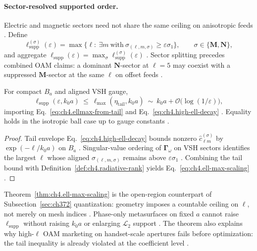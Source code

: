 \paragraph{Sector-resolved supported order.}
Electric and magnetic sectors need not share the same ceiling on anisotropic feeds \cite{harrington2001}. Define
\begin{equation}
\label{eq:ch4.ell-sector-supported}
\ell_{\mathrm{supp}}^{(\sigma)}(\varepsilon)
=
\max\big\{\ell:\ \exists m\ \text{with}\ \sigma_{(\ell,m,\sigma)}\ge\varepsilon\sigma_{1}\big\},
\qquad
\sigma\in\{\mathbf{M},\mathbf{N}\},
\end{equation}
and aggregate \(\ell_{\mathrm{supp}}(\varepsilon)=\max_{\sigma}\ell_{\mathrm{supp}}^{(\sigma)}(\varepsilon)\) \cite{hansen1988,stratton1941}.
Sector splitting precedes combined OAM claims: a dominant \(\mathbf{N}\)-sector at \(\ell=5\) may coexist with a suppressed
\(\mathbf{M}\)-sector at the same \(\ell\) on offset feeds \cite{harrington2001,devaney2004}.

\begin{theorem}
\label{thm:ch4.ell-max-scaling}
For compact \(B_{a}\) and aligned VSH gauge,
\begin{equation}
\label{eq:ch4.ell-max-scaling}
\ell_{\mathrm{supp}}(\varepsilon,k_{0}a)
\ \le\
\ell_{\max}(\eta_{\mathrm{tail}},k_{0}a)
\ \sim\
k_{0}a+\mathcal{O}\!\big(\log(1/\varepsilon)\big),
\end{equation}
importing Eq.~\eqref{eq:ch4.ellmax-from-tail} and Eq.~\eqref{eq:ch4.high-ell-decay} \cite{hansen1988,jackson1999,stratton1941}.
Equality holds in the isotropic ball case up to gauge constants \cite{harrington2001,devaney2004}.
\end{theorem}
\begin{proof}
Tail envelope Eq.~\eqref{eq:ch4.high-ell-decay} bounds nonzero \(\widehat{c}_{\ell m}^{(\sigma)}\) by
\(\exp(-\ell/k_{0}a)\) on \(B_{a}\) \cite{hansen1988,jackson1999}. Singular-value ordering of \(\boldsymbol{\Gamma}_\omega\) on VSH
sectors identifies the largest \(\ell\) whose aligned \(\sigma_{(\ell,m,\sigma)}\) remains above \(\varepsilon\sigma_{1}\)
\cite{stratton1941,harrington2001}. Combining the tail bound with Definition~\ref{def:ch4.radiative-rank} yields
Eq.~\eqref{eq:ch4.ell-max-scaling} \cite{devaney2004}.
\end{proof}

Theorem~\ref{thm:ch4.ell-max-scaling} is the open-region counterpart of Subsection~\ref{sec:ch372} quantization: geometry imposes a
countable ceiling on \(\ell\), not merely on mesh indices \cite{stratton1941}. Phase-only metasurfaces on fixed \(a\) cannot raise
\(\ell_{\mathrm{supp}}\) without raising \(k_{0}a\) or enlarging \(\mathcal{L}_{2}\) support \cite{devaney2004,hansen1988}. The theorem
also explains why high-\(\ell\) OAM marketing on handset-scale apertures fails before optimization: the tail inequality is already violated
at the coefficient level \cite{harrington2001,jackson1999}.

